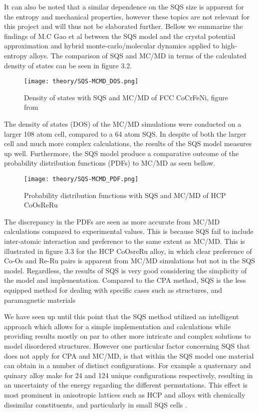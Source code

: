 It can also be noted that a similar dependence on the SQS size is apparent for the entropy and mechanical properties, however these topics are not relevant for this project and will thus not be elaborated further. Bellow we summarize the findings of M.C Gao et al between the SQS model and the crystal potential approximation and hybrid monte-carlo/molecular dynamics applied to high-entropy alloys. The comparison of SQS and MC/MD in terms of the calculated density of states can be seen in figure 3.2.
      
\begin{figure}[H]
\centering
\texttt{[image: theory/SQS-MCMD\_DOS.png]}
\caption{Density of states with SQS and MC/MD of FCC CoCrFeNi, figure from \cite{hea2016_ch10}}
\end{figure}

The density of states (DOS) of the MC/MD simulations were conducted on a larger 108 atom cell, compared to a 64 atom SQS. In despite of both the larger cell and much more complex calculations, the results of the SQS model measures up well. Furthermore, the SQS model produce a comparative outcome of the probability distribution functions (PDFs) to MC/MD as seen bellow. 

\begin{figure}[H]
\centering
\texttt{[image: theory/SQS-MCMD\_PDF.png]}
\caption{Probability distribution functions with SQS and MC/MD of HCP CoOsReRu \cite{hea2016_ch10}}
\end{figure}

The discrepancy in the PDFs are seen as more accurate from MC/MD calculations compared to experimental values. This is because SQS fail to include inter-atomic interaction and preference to the same extent as MC/MD. This is illustrated in figure 3.3 for the HCP CoOsreRu alloy, in which clear preference of Co-Os and Re-Ru pairs is apparent from MC/MD simulations but not in the SQS model. Regardless, the results of SQS is very good considering the simplicity of the model and implementation. Compared to the CPA method, SQS is the less equipped method for dealing with specific cases such as  structures, and paramagnetic materials \cite{hea2016_ch10} 

We have seen up until this point that the SQS method utilized an intelligent approach which allows for a simple implementation and calculations while providing results mostly on par to other more intricate and complex solutions to model disordered structures. However one particular factor concerning SQS that does not apply for CPA and MC/MD, is that within the SQS model one material can obtain in a number of distinct configurations. For example a quaternary and quinary alloy make for 24 and 124 unique configurations respectively, resulting in an uncertainty of the energy regarding the different permutations. This effect is most prominent in anisotropic lattices such as HCP and alloys with chemically dissimilar constituents, and particularly in small SQS cells \cite{hea2016_ch10}. 

